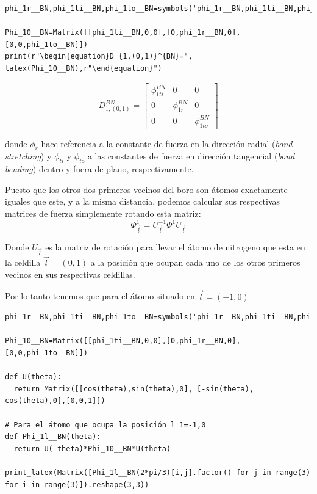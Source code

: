 \documentclass[12pt,a4paper]{article}
\begin{document}
\begin{verbatim}
phi_1r__BN,phi_1ti__BN,phi_1to__BN=symbols('phi_1r__BN,phi_1ti__BN,phi_1to__BN')

Phi_10__BN=Matrix([[phi_1ti__BN,0,0],[0,phi_1r__BN,0],[0,0,phi_1to__BN]])
print(r"\begin{equation}D_{1,(0,1)}^{BN}=", latex(Phi_10__BN),r"\end{equation}")
\end{verbatim}

\begin{equation}
D_{1,(0,1)}^{BN}= \left[\begin{matrix}\phi^{BN}_{1ti} & 0 & 0\\0 & \phi^{BN}_{1r} & 0\\0 & 0 & \phi^{BN}_{1to}\end{matrix}\right]
\end{equation}

\vspace{0.7cm}



donde \(\phi_r\) hace referencia a la constante de fuerza en la dirección radial (\emph{bond stretching}) y \(\phi_{ti}\) y \(\phi_{to}\) a las constantes de fuerza en dirección tangencial (\emph{bond bending}) dentro y fuera de plano, respectivamente.

Puesto que los otros dos primeros vecinos del boro son átomos exactamente iguales que este, y a la misma distancia, podemos calcular sus respectivas matrices de fuerza simplemente rotando esta matriz:
\begin{equation}
\label{eq:2}
\Phi^1_{\vec l}=U_{\vec l}^{-1}\Phi^1U_{\vec l}
\end{equation}

Donde \(U_{\vec l}\) es la matriz de rotación para llevar el átomo de nitrogeno que esta en la celdilla \(\vec l=(0, 1)\) a la posición que ocupan cada uno de los otros primeros vecinos en sus respectivas celdillas.

Por lo tanto tenemos que para el átomo situado en \(\vec l=(-1,0)\)
\begin{verbatim}
phi_1r__BN,phi_1ti__BN,phi_1to__BN=symbols('phi_1r__BN,phi_1ti__BN,phi_1to__BN')

Phi_10__BN=Matrix([[phi_1ti__BN,0,0],[0,phi_1r__BN,0],[0,0,phi_1to__BN]])

def U(theta):
  return Matrix([[cos(theta),sin(theta),0], [-sin(theta), cos(theta),0],[0,0,1]])

# Para el átomo que ocupa la posición l_1=-1,0
def Phi_1l__BN(theta):
  return U(-theta)*Phi_10__BN*U(theta)

print_latex(Matrix([Phi_1l__BN(2*pi/3)[i,j].factor() for j in range(3) for i in range(3)]).reshape(3,3))
\end{verbatim}
\end{document}
